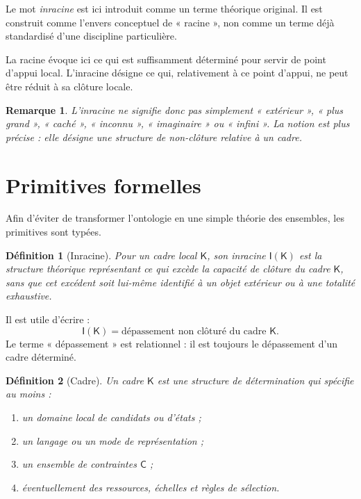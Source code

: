 \documentclass[11pt,a4paper]{article}
\newtheorem{definition}{Définition}[section]
\newtheorem{remark}{Remarque}[section]
\newcommand{\Inrac}{\mathsf{I}}
\newcommand{\Cadre}{\mathsf{K}}
\newcommand{\Con}{\mathsf{C}}
\begin{document}
Le mot \emph{inracine} est ici introduit comme un terme théorique original. Il
est construit comme l'envers conceptuel de « racine », non comme un terme déjà
standardisé d'une discipline particulière.

La racine évoque ici ce qui est suffisamment déterminé pour servir de point
d'appui local. L'inracine désigne ce qui, relativement à ce point d'appui,
ne peut être réduit à sa clôture locale.

\begin{remark}
L'inracine ne signifie donc pas simplement « extérieur », « plus grand »,
« caché », « inconnu », « imaginaire » ou « infini ». La notion est plus précise :
elle désigne une \emph{structure de non-clôture relative à un cadre}.
\end{remark}

\section{Primitives formelles}

Afin d'éviter de transformer l'ontologie en une simple théorie des ensembles,
les primitives sont typées.

\begin{definition}[Inracine]
Pour un cadre local \(\Cadre\), son \emph{inracine} \(\Inrac(\Cadre)\) est la
structure théorique représentant ce qui excède la capacité de clôture du cadre
\(\Cadre\), sans que cet excédent soit lui-même identifié à un objet extérieur
ou à une totalité exhaustive.
\end{definition}

Il est utile d'écrire :
\[
\boxed{
\Inrac(\Cadre)=\text{dépassement non clôturé du cadre }\Cadre.
}
\]
Le terme « dépassement » est relationnel : il est toujours le dépassement
d'un cadre déterminé.

\begin{definition}[Cadre]
Un \emph{cadre} \(\Cadre\) est une structure de détermination qui spécifie au
moins :
\begin{enumerate}
    \item un domaine local de candidats ou d'états ;
    \item un langage ou un mode de représentation ;
    \item un ensemble de contraintes \(\Con\) ;
    \item éventuellement des ressources, échelles et règles de sélection.
\end{enumerate}
\end{definition}
\end{document}

